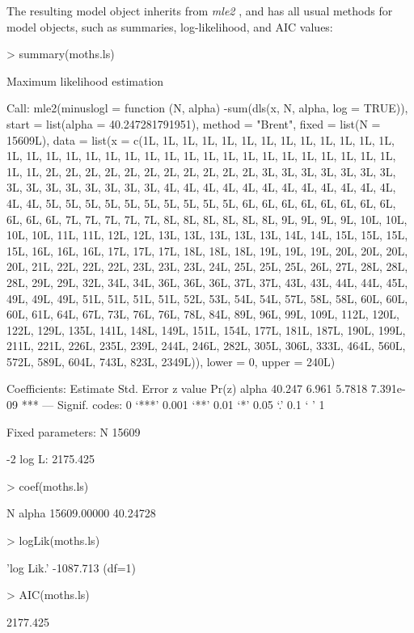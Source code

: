 \documentclass[11pt, A4]{article}
\begin{document}
The resulting model object inherits from \emph{mle2}
\citep{Bolkerbbmle}, and has all usual methods for model objects, such as
summaries, log-likelihood, and AIC values:
\begin{Schunk}
\begin{Sinput}
> summary(moths.ls)
\end{Sinput}
\begin{Soutput}
Maximum likelihood estimation

Call:
mle2(minuslogl = function (N, alpha) 
-sum(dls(x, N, alpha, log = TRUE)), start = list(alpha = 40.247281791951), 
    method = "Brent", fixed = list(N = 15609L), data = list(x = c(1L, 
    1L, 1L, 1L, 1L, 1L, 1L, 1L, 1L, 1L, 1L, 1L, 1L, 1L, 1L, 1L, 
    1L, 1L, 1L, 1L, 1L, 1L, 1L, 1L, 1L, 1L, 1L, 1L, 1L, 1L, 1L, 
    1L, 1L, 1L, 1L, 2L, 2L, 2L, 2L, 2L, 2L, 2L, 2L, 2L, 2L, 2L, 
    3L, 3L, 3L, 3L, 3L, 3L, 3L, 3L, 3L, 3L, 3L, 3L, 3L, 3L, 3L, 
    4L, 4L, 4L, 4L, 4L, 4L, 4L, 4L, 4L, 4L, 4L, 4L, 4L, 4L, 5L, 
    5L, 5L, 5L, 5L, 5L, 5L, 5L, 5L, 5L, 6L, 6L, 6L, 6L, 6L, 6L, 
    6L, 6L, 6L, 6L, 6L, 7L, 7L, 7L, 7L, 7L, 8L, 8L, 8L, 8L, 8L, 
    8L, 9L, 9L, 9L, 9L, 10L, 10L, 10L, 10L, 11L, 11L, 12L, 12L, 
    13L, 13L, 13L, 13L, 13L, 14L, 14L, 15L, 15L, 15L, 15L, 16L, 
    16L, 16L, 17L, 17L, 17L, 18L, 18L, 18L, 19L, 19L, 19L, 20L, 
    20L, 20L, 20L, 21L, 22L, 22L, 22L, 23L, 23L, 23L, 24L, 25L, 
    25L, 25L, 26L, 27L, 28L, 28L, 28L, 29L, 29L, 32L, 34L, 34L, 
    36L, 36L, 36L, 37L, 37L, 43L, 43L, 44L, 44L, 45L, 49L, 49L, 
    49L, 51L, 51L, 51L, 51L, 52L, 53L, 54L, 54L, 57L, 58L, 58L, 
    60L, 60L, 60L, 61L, 64L, 67L, 73L, 76L, 76L, 78L, 84L, 89L, 
    96L, 99L, 109L, 112L, 120L, 122L, 129L, 135L, 141L, 148L, 
    149L, 151L, 154L, 177L, 181L, 187L, 190L, 199L, 211L, 221L, 
    226L, 235L, 239L, 244L, 246L, 282L, 305L, 306L, 333L, 464L, 
    560L, 572L, 589L, 604L, 743L, 823L, 2349L)), lower = 0, upper = 240L)

Coefficients:
      Estimate Std. Error z value     Pr(z)    
alpha   40.247      6.961  5.7818 7.391e-09 ***
---
Signif. codes:  
0 ‘***’ 0.001 ‘**’ 0.01 ‘*’ 0.05 ‘.’ 0.1 ‘ ’ 1

Fixed parameters:
    N 
15609 

-2 log L: 2175.425 
\end{Soutput}
\begin{Sinput}
> coef(moths.ls)
\end{Sinput}
\begin{Soutput}
          N       alpha 
15609.00000    40.24728 
\end{Soutput}
\begin{Sinput}
> logLik(moths.ls)
\end{Sinput}
\begin{Soutput}
'log Lik.' -1087.713 (df=1)
\end{Soutput}
\begin{Sinput}
> AIC(moths.ls)
\end{Sinput}
\begin{Soutput}
[1] 2177.425
\end{Soutput}
\end{Schunk}
\end{document}
